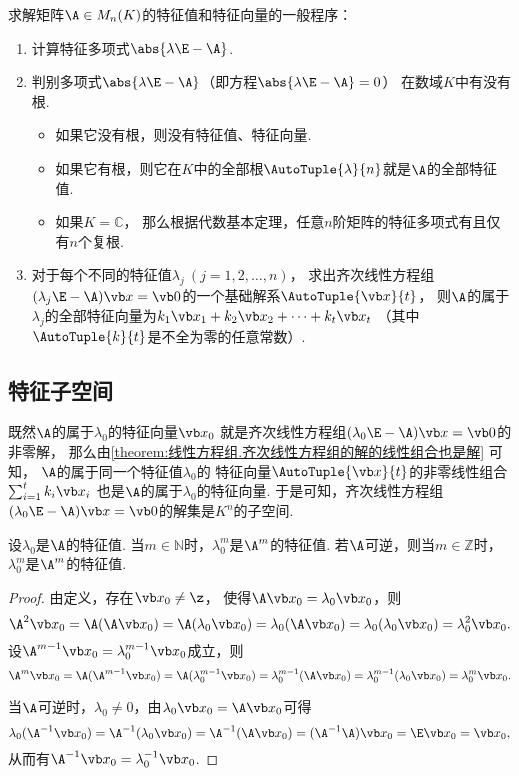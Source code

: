 求解矩阵\(\A \in M_n(K)\)的特征值和特征向量的一般程序：\begin{enumerate}
	\item 计算特征多项式\(\abs{\lambda\E-\A}\).

	\item 判别多项式\(\abs{\lambda\E-\A}\)（即方程\(\abs{\lambda\E-\A}=0\)）
	在数域\(K\)中有没有根.
	\begin{itemize}
		\item 如果它没有根，则没有特征值、特征向量.
		\item 如果它有根，则它在\(K\)中的全部根\(\AutoTuple{\lambda}{n}\)就是\(\A\)的全部特征值.
		\item 如果\(K = \mathbb{C}\)，
		那么根据代数基本定理，任意\(n\)阶矩阵的特征多项式有且仅有\(n\)个复根.
	\end{itemize}

	\item 对于每个不同的特征值\(\lambda_j\ (j=1,2,\dotsc,n)\)，
	求出齐次线性方程组\((\lambda_j \E - \A)\x = \vb0\)的一个基础解系\(\AutoTuple{\x}{t}\)，
	则\(\A\)的属于\(\lambda_j\)的全部特征向量为\(k_1 \x_1 + k_2 \x_2 + \dotsb + k_t \x_t\)
	（其中\(\AutoTuple{k}{t}\)是不全为零的任意常数）.
\end{enumerate}

\subsection{特征子空间}
既然\(\A\)的属于\(\lambda_0\)的特征向量\(\x_0\)
就是齐次线性方程组\((\lambda_0\E-\A)\x=\vb0\)的非零解，
那么由\cref{theorem:线性方程组.齐次线性方程组的解的线性组合也是解} 可知，
\(\A\)的属于同一个特征值\(\lambda_0\)的
特征向量\(\AutoTuple{\x}{t}\)的非零线性组合
\(\sum_{i=1}^t k_i \x_i\)
也是\(\A\)的属于\(\lambda_0\)的特征向量.
于是可知，齐次线性方程组\((\lambda_0\E-\A)\x=\vb0\)的解集是\(K^n\)的子空间.
\begin{proposition}
设\(\lambda_0\)是\(\A\)的特征值.
当\(m\in\mathbb{N}\)时，\(\lambda_0^m\)是\(\A^m\)的特征值.
若\(\A\)可逆，则当\(m\in\mathbb{Z}\)时，\(\lambda_0^m\)是\(\A^m\)的特征值.
\begin{proof}
由定义，存在\(\x_0\neq\z\)，
使得\(\A\x_0 = \lambda_0\x_0\)，则\[
	\A^2\x_0 = \A(\A\x_0)
	=\A(\lambda_0\x_0)
	=\lambda_0(\A\x_0)
	=\lambda_0(\lambda_0\x_0)
	=\lambda_0^2\x_0.
\]
设\(\A^{m-1}\x_0 = \lambda_0^{m-1}\x_0\)成立，则\[
	\A^m\x_0 = \A(\A^{m-1}\x_0)
	= \A(\lambda_0^{m-1}\x_0)
	= \lambda_0^{m-1}(\A\x_0)
	= \lambda_0^{m-1}(\lambda_0\x_0)
	= \lambda_0^m\x_0.
\]

当\(\A\)可逆时，\(\lambda_0\neq0\)，由\(\lambda_0\x_0 = \A\x_0\)可得\[
	\lambda_0(\A^{-1}\x_0)
	= \A^{-1}(\lambda_0\x_0)
	= \A^{-1}(\A\x_0)
	= (\A^{-1}\A)\x_0
	= \E\x_0
	= \x_0,
\]
从而有\(\A^{-1}\x_0 = \lambda_0^{-1}\x_0\).
\end{proof}
\end{proposition}

